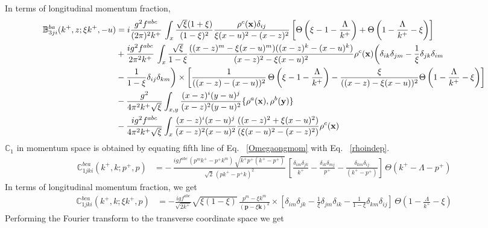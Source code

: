 \documentclass[aps,prd,amsmath,amssymb,nofootinbib]{revtex4-2}
\def\mf#1{\mathbb{#1}}
\def\v#1{\mathbf{#1}}
\numberwithin{equation}{section}
\begin{document}
In terms of longitudinal momentum fraction,
\begin{align}
   \mf{B}^{ba}_{3ji}(k^+, z;\xi k^+, -u) & = i \frac{g^2 f^{abc}}{(2\pi)^{2} k^{+}}\,\int_{x}
   \frac{\sqrt{\xi} (1+\xi) } {(1-\xi)^2} \frac{\rho^c(\v{x}) \delta_{ij}}{\xi (x-u)^{2} - (x-z)^{2} }\left[\Theta\left(\xi - 1 - \frac{\Lambda}{k^{+}}\right)+\Theta\left(1-\frac{\Lambda}{k^{+}}-\xi\right)\right]  \notag \\ & + \frac{ig^2 f^{abc}} {2\pi^{2} k^{+}}\,  
   \int_{x}  
   \frac{\sqrt{\xi}}{1-\xi} 
   \frac{((x-z)^{m} - \xi (x-u)^m)((x-z)^{k} -  (x-u)^{k})} {(x-z)^{2} - \xi (x-u)^2}
   \rho^c(\v{x}) \bigg( 
  \delta_{ik} \delta_{jm}
  - \frac{1}{\xi}\delta_{jk} \delta_{im}
 \notag \\ &  - \frac{1}{1-\xi}\delta_{ij} \delta_{km}
   \bigg)\times  \left[\frac{1}{((x-z) -  (x-u))^2}\,\Theta\left(\xi - 1 - \frac{\Lambda}{k^{+}}\right)-\frac{\xi}{((x-z) -  \xi (x-u))^2} \Theta\left(1-\frac{\Lambda}{k^{+}}-\xi\right)\right]\notag \\ & -\frac{g^{2}}{4\pi^{2} k^{+}\sqrt{\xi}}\int_{x,y}\frac{(x-z)^{i} (y-u)^{j}}{(x-z)^{ 2}(y-u)^{2}}\{\rho^{a}(\v{x}),\rho^{b}(\v{y})\} \notag \\ &  -\frac{ig^{2}f^{abc}}{4\pi^{2} k^{+}\sqrt{\xi}} \int_{x}\frac{(x-z)^{i}(x-u)^{j}}{(x-z)^{2}(x-u)^{2}}\frac{((x-z)^{2} +\xi (x-u)^{2})}{(\xi (x-u)^{2}-(x-z)^{2})}\rho^{c}(\v{x})
\end{align}
$\mf{C}_{1}$ in momentum space is obtained by equating fifth line of Eq.~ \eqref{Omegaongmom} with Eq.~ \eqref{rhoindep}. 
\begin{align}
    \mf{C}^{bca}_{1jki}(k^{+},k; p^{+},p) & = -\,\frac{igf^{abc}\, \left(p^{m}k^{+}-p^{+}k^{m}\right)\,\sqrt{k^{+}p^{+}(k^{+}-p^{+})}}{\sqrt{2}\,\left(pk^{+}-p^{+}k\right)^{2}}\,\left[\frac{\delta_{im}\delta_{jk}}{k^{+}}-\frac{\delta_{ik}\delta_{mj}}{p^{+}}-\frac{\delta_{km}\delta_{ij}}{(k^{+}-p^{+})}\right]\,\Theta\left(k^{+}-\Lambda-p^{+}\right) 
\end{align}
In terms of longitudinal momentum fraction, we get
\begin{align}
  \mf{C}^{bca}_{1jki}(k^{+}, k; \xi k^{+}, p) & = -\frac{ i g f^{abc}} {\sqrt{2 k^+}} 
    \sqrt{\xi (1-\xi)}\,  
   \frac{p^m - \xi k^m  }{( \v{p}- \xi \v{k} )^2 } \times
   \left[ \delta_{im} \delta_{jk}
     - \frac{1}{\xi}\delta_{jm} \delta_{ik}
   - \frac{1}{1-\xi} \delta_{km}\delta_{ij}
 \right]\, \Theta\left(1-\frac{\Lambda}{k^{+}}-\xi\right)
\end{align}
Performing the Fourier transform to the transverse coordinate space we get
\end{document}
